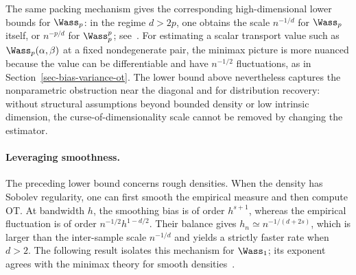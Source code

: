 The same packing mechanism gives the corresponding high-dimensional lower bounds for \(\Wass_p\): in the regime \(d>2p\), one obtains the scale \(n^{-1/d}\) for \(\Wass_p\) itself, or \(n^{-p/d}\) for \(\Wass_p^p\); see~\cite{singh2018minimax,weed2017sharp}. For estimating a scalar transport value such as \(\Wass_p(\alpha,\beta)\) at a fixed nondegenerate pair, the minimax picture is more nuanced because the value can be differentiable and have \(n^{-1/2}\) fluctuations, as in Section~\ref{sec-bias-variance-ot}. The lower bound above nevertheless captures the nonparametric obstruction near the diagonal and for distribution recovery: without structural assumptions beyond bounded density or low intrinsic dimension, the curse-of-dimensionality scale cannot be removed by changing the estimator.

\paragraph{Leveraging smoothness.}
The preceding lower bound concerns rough densities. When the density has Sobolev regularity, one can first smooth the empirical measure and then compute OT\@. At bandwidth \(h\), the smoothing bias is of order \(h^{s+1}\), whereas the empirical fluctuation is of order \(n^{-1/2}h^{1-d/2}\). Their balance gives \(h_n\simeq n^{-1/(d+2s)}\), which is larger than the inter-sample scale \(n^{-1/d}\) and yields a strictly faster rate when \(d>2\). The following result isolates this mechanism for \(\Wass_1\); its exponent agrees with the minimax theory for smooth densities~\cite{nilesweed2019minimaxSmooth,divol2022measure}.

